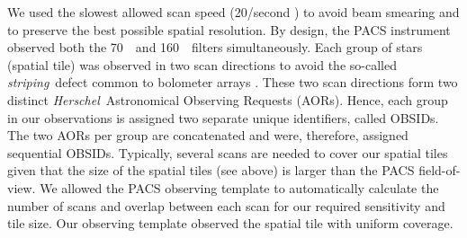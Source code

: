 \documentclass[manuscript]{aastex61}
\newcommand{\herschel}{{\em Herschel}}
\begin{document}
\par
We used the slowest allowed scan speed (20\arcsec/second ) to avoid beam smearing and to preserve the best possible spatial resolution.   By design, the PACS instrument observed both the 70~\micron\ and 160~\micron\ filters simultaneously.  Each group of stars (spatial tile) was observed in two scan directions to avoid the so-called {\em striping}\ defect common to bolometer arrays \citep{boloref}.  These two scan directions form two distinct \herschel\ Astronomical Observing Requests (AORs).  Hence, each group in our observations is assigned two separate unique identifiers, called OBSIDs.  The two AORs per group are concatenated and were, therefore, assigned sequential OBSIDs.  Typically, several scans are needed to cover our spatial tiles given that the size of the spatial tiles (see above) is larger than the PACS field-of-view.  We allowed the PACS observing template to automatically calculate the number of scans and overlap between each scan for our required sensitivity and tile size.  Our observing template observed the spatial tile with uniform coverage.
\end{document}
